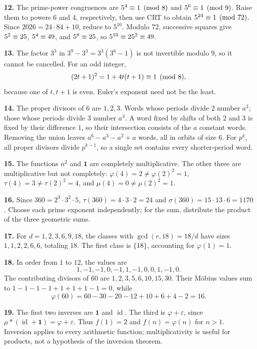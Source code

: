 \textbf{12.} The prime-power congruences are $5^4\equiv1\pmod8$
and $5^6\equiv1\pmod9$. Raise them to powers $6$ and $4$,
respectively, then use CRT to obtain $5^{24}\equiv1\pmod{72}$.
Since $2026=24\cdot84+10$, reduce to $5^{10}$.
Modulo $72$, successive squares give $5^2\equiv25$, $5^4\equiv49$,
and $5^8\equiv25$, so $5^{10}\equiv25^2\equiv49$.

\textbf{13.} The factor $3^3$ in $3^9-3^3=3^3(3^6-1)$ is not
invertible modulo $9$, so it cannot be cancelled. For an odd integer,
\[
 (2t+1)^2=1+4t(t+1)\equiv1\pmod8,
\]
because one of $t,t+1$ is even. Euler's exponent need not be the least.

\textbf{14.} The proper divisors of $6$ are $1,2,3$. Words whose
periods divide $2$ number $a^2$; those whose periods divide $3$
number $a^3$. A word fixed by shifts of both $2$ and $3$ is fixed
by their difference $1$, so their intersection consists of the $a$
constant words. Removing the union leaves $a^6-a^3-a^2+a$ words,
all in orbits of size $6$. For $p^k$, all proper divisors divide
$p^{k-1}$, so a single set contains every shorter-period word.

\textbf{15.} The functions $n^2$ and $\mathbf{1}$ are completely
multiplicative. The other three are multiplicative but not completely:
$\varphi(4)=2\ne\varphi(2)^2=1$,
$\tau(4)=3\ne\tau(2)^2=4$, and
$\mu(4)=0\ne\mu(2)^2=1$.

\textbf{16.} Since $360=2^3\cdot3^2\cdot5$,
$\tau(360)=4\cdot3\cdot2=24$ and
$\sigma(360)=15\cdot13\cdot6=1170$.
Choose each prime exponent independently; for the sum, distribute
the product of the three geometric sums.

\textbf{17.} For $d=1,2,3,6,9,18$, the classes with
$\gcd(r,18)=18/d$ have sizes $1,1,2,2,6,6$, totaling $18$.
The first class is $\{18\}$, accounting for $\varphi(1)=1$.

\textbf{18.} In order from $1$ to $12$, the values are
\[
 1,-1,-1,0,-1,1,-1,0,0,1,-1,0.
\]
The contributing divisors of $60$ are $1,2,3,5,6,10,15,30$.
Their M\"obius values sum to $1-1-1-1+1+1+1-1=0$, while
\[
 \varphi(60)=60-30-20-12+10+6+4-2=16.
\]

\textbf{19.} The first two inverses are $\mathbf{1}$ and
$\operatorname{id}$. The third is $\varphi+\varepsilon$, since
$\mu*(\operatorname{id}+\mathbf{1})=\varphi+\varepsilon$.
Thus $f(1)=2$ and $f(n)=\varphi(n)$ for $n>1$.
Inversion applies to every arithmetic function; multiplicativity
is useful for products, not a hypothesis of the inversion theorem.

